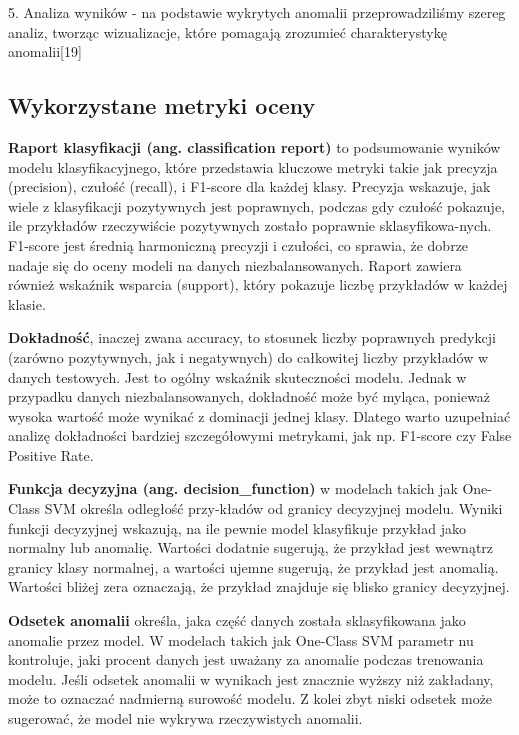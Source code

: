 \documentclass[a4paper,fleqn]{cas-dc}
\begin{document}
5. Analiza wyników - na podstawie wykrytych anomalii przeprowadziliśmy szereg analiz, tworząc wizualizacje, które pomagają zrozumieć charakterystykę anomalii[19]

\subsection{Wykorzystane metryki oceny}


\textbf{Raport klasyfikacji (ang. classification report)} to podsumowanie wyników modelu klasyfikacyjnego, które przedstawia kluczowe metryki takie jak precyzja (precision), czułość (recall), i F1-score dla każdej klasy. Precyzja wskazuje, jak wiele z klasyfikacji pozytywnych jest poprawnych, podczas gdy czułość pokazuje, ile przykładów rzeczywiście pozytywnych zostało poprawnie sklasyfikowa-nych. F1-score jest średnią harmoniczną precyzji i czułości, co sprawia, że dobrze nadaje się do oceny modeli na danych niezbalansowanych. Raport zawiera również wskaźnik wsparcia (support), który pokazuje liczbę przykładów w każdej klasie.

\textbf{Dokładność}, inaczej zwana accuracy, to stosunek liczby poprawnych predykcji (zarówno pozytywnych, jak i negatywnych) do całkowitej liczby przykładów w danych testowych. Jest to ogólny wskaźnik skuteczności modelu. Jednak w przypadku danych niezbalansowanych, dokładność może być myląca, ponieważ wysoka wartość może wynikać z dominacji jednej klasy. Dlatego warto uzupełniać analizę dokładności bardziej szczegółowymi metrykami, jak np. F1-score czy False Positive Rate.

\textbf{Funkcja decyzyjna (ang. decision\_function)} w modelach takich jak One-Class SVM określa odległość przy-kładów od granicy decyzyjnej modelu. Wyniki funkcji decyzyjnej wskazują, na ile pewnie model klasyfikuje przykład jako normalny lub anomalię. Wartości dodatnie sugerują, że przykład jest wewnątrz granicy klasy normalnej, a wartości ujemne sugerują, że przykład jest anomalią. Wartości bliżej zera oznaczają, że przykład znajduje się blisko granicy decyzyjnej.

\textbf{Odsetek anomalii} określa, jaka część danych została sklasyfikowana jako anomalie przez model. W modelach takich jak One-Class SVM parametr nu kontroluje, jaki procent danych jest uważany za anomalie podczas trenowania modelu. Jeśli odsetek anomalii w wynikach jest znacznie wyższy niż zakładany, może to oznaczać nadmierną surowość modelu. Z kolei zbyt niski odsetek może sugerować, że model nie wykrywa rzeczywistych anomalii.
\end{document}
